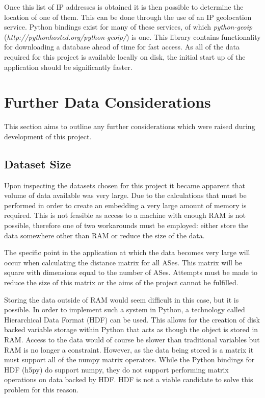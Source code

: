 Once this list of IP addresses is obtained it is then possible to determine the location of one of them. This can be done through the use of an IP geolocation service. Python bindings exist for many of these services, of which \textit{python-geoip} (\textit{http://pythonhosted.org/python-geoip/}) is one. This library contains functionality for downloading a database ahead of time for fast access. As all of the data required for this project is available locally on disk, the initial start up of the application should be significantly faster. 

\section{Further Data Considerations}

This section aims to outline any further considerations which were raised during development of this project.

\subsection{Dataset Size}

Upon inspecting the datasets chosen for this project it became apparent that volume of data available was very large. Due to the calculations that must be performed in order to create an embedding a very large amount of memory is required. This is not feasible as access to a machine with enough RAM is not possible, therefore one of two workarounds must be employed: either store the data somewhere other than RAM or reduce the size of the data. 

The specific point in the application at which the data becomes very large will occur when calculating the distance matrix for all ASes. This matrix will be square with dimensions equal to the number of ASes. Attempts must be made to reduce the size of this matrix or the aims of the project cannot be fulfilled.

Storing the data outside of RAM would seem difficult in this case, but it is possible. In order to implement such a system in Python, a technology called Hierarchical Data Format (HDF) can be used. This allows for the creation of disk backed variable storage within Python that acts as though the object is stored in RAM. Access to the data would of course be slower than traditional variables but RAM is no longer a constraint. However, as the data being stored is a matrix it must support all of the numpy matrix operators. While the Python bindings for HDF (h5py) do support numpy, they do not support performing matrix operations on data backed by HDF. HDF is not a viable candidate to solve this problem for this reason.

